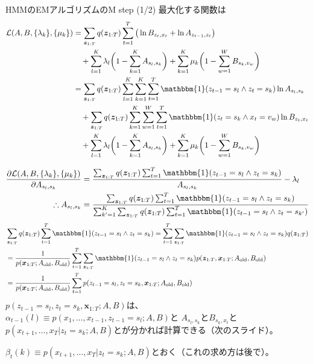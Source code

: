 \documentclass[aspectratio=169,unicode,dvipdfmx,14pt]{beamer}
\begin{document}
\begin{frame}{HMMのEMアルゴリズムのM step (1/2)}
\FontMath
最大化する関数は
\begin{align}
\mathcal{L}(A, B, \{ \lambda_k \} , \{ \mu_k \})
& 
= \sum_{\bm{z}_{1:T}} q(\bm{z}_{1:T}) \sum_{t=1}^T \big( \ln B_{z_t,x_t} + \ln A_{z_{t-1},z_t} \big)
\notag \\ & \mbox{ \ \ }
+ \sum_{l=1}^K \lambda_l \bigg( 1 - \sum_{k=1}^K A_{s_l, s_k} \bigg)
+ \sum_{k=1}^K \mu_k \bigg( 1 - \sum_{w=1}^W B_{s_k, v_w} \bigg)
\notag \\ &
= 
\sum_{\bm{z}_{1:T}} q(\bm{z}_{1:T}) \sum_{l=1}^K \sum_{k=1}^K \sum_{t=1}^T 
\mathbbm{1}( z_{t-1} = s_l \wedge z_t = s_k ) \ln A_{s_l, s_k}
\notag \\ & \mbox{ \ \ }
+ \sum_{\bm{z}_{1:T}} q(\bm{z}_{1:T}) \sum_{k=1}^K \sum_{w=1}^W \sum_{t=1}^T 
\mathbbm{1}( z_t = s_k \wedge x_t = v_w ) \ln B_{z_t,x_t}
\notag \\ & \mbox{ \ \ }
+ \sum_{l=1}^K \lambda_l \bigg( 1 - \sum_{k=1}^K A_{s_l, s_k} \bigg)
+ \sum_{k=1}^K \mu_k \bigg( 1 - \sum_{w=1}^W B_{s_k, v_w} \bigg)
\end{align}
\end{frame}


\begin{frame}
\FontMath
\vspace{-.1in}
\begin{align}
\frac{\partial \mathcal{L}(A, B, \{ \lambda_k \} , \{ \mu_k \}) }{\partial A_{s_l, s_k}}
& = \frac{ \sum_{\bm{z}_{1:T}} q(\bm{z}_{1:T}) \sum_{t=1}^T 
\mathbbm{1}( z_{t-1} = s_l \wedge z_t = s_k ) }{A_{s_l, s_k}}
- \lambda_l
\\
\therefore A_{s_l, s_k} & = \frac{ \sum_{\bm{z}_{1:T}} q(\bm{z}_{1:T}) \sum_{t=1}^T 
\mathbbm{1}( z_{t-1} = s_l \wedge z_t = s_k ) }
{ \sum_{k^\prime=1}^K \sum_{\bm{z}_{1:T}} q(\bm{z}_{1:T}) \sum_{t=1}^T \mathbbm{1}( z_{t-1} = s_l \wedge z_t = s_{k^\prime} ) }
\end{align}
\begin{align}
& \sum_{\bm{z}_{1:T}} q(\bm{z}_{1:T}) \sum_{t=1}^T 
\mathbbm{1}( z_{t-1} = s_l \wedge z_t = s_k )
=
\sum_{t=1}^T \sum_{\bm{z}_{1:T}}  
\mathbbm{1}( z_{t-1} = s_l \wedge z_t = s_k )q(\bm{z}_{1:T})
\notag \\ &
= 
\frac{1}{p(\bm{x}_{1:T}; A_{\mbox{\scriptsize old}}, B_{\mbox{\scriptsize old}})}
\sum_{t=1}^T \sum_{\bm{z}_{1:T}}  
\mathbbm{1}( z_{t-1} = s_l \wedge z_t = s_k ) 
p(\bm{z}_{1:T} , \bm{x}_{1:T}; A_{\mbox{\scriptsize old}}, B_{\mbox{\scriptsize old}})
\notag \\ &
= 
\frac{1}{p(\bm{x}_{1:T}; A_{\mbox{\scriptsize old}}, B_{\mbox{\scriptsize old}})}
\sum_{t=1}^T p(z_{t-1}=s_l, z_t=s_k, \bm{x}_{1:T}; A_{\mbox{\scriptsize old}}, B_{\mbox{\scriptsize old}})
\end{align}
$p(z_{t-1}=s_l, z_t=s_k, \bm{x}_{1:T}; A, B)$は、
$\alpha_{t-1}(l) \equiv p(x_1,\ldots, x_{t-1}, z_{t-1}=s_l; A, B)$と
$A_{s_l,s_k}$と$B_{s_k,x_t}$と
$p(x_{t+1},\ldots,x_T|z_t=s_k;A,B)$とが分かれば計算できる（次のスライド）。

$\beta_t(k) \equiv p(x_{t+1},\ldots,x_T|z_t=s_k;A,B)$とおく（これの求め方は後で）。
\end{frame}
\end{document}
